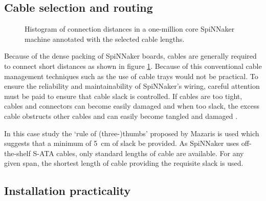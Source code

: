 		\subsection{Cable selection and routing}
			
			\begin{figure}
				
				\center
				
				\caption{Histogram of connection distances in a one-million core
				SpiNNaker machine annotated with the selected cable lengths.}
				\label{fig:wire-length-histogram}
				
			\end{figure}
			
			Because of the dense packing of SpiNNaker boards, cables are generally
			required to connect short distances as shown in figure
			\ref{fig:wire-length-histogram}. Because of this conventional cable
			management techniques such as the use of cable trays would not be
			practical. To ensure the reliability and maintainability of SpiNNaker's
			wiring, careful attention must be paid to ensure that cable slack is
			controlled.  If cables are too tight, cables and connectors can become
			easily damaged and when too slack, the excess cable obstructs other
			cables and can easily become tangled and damaged \cite{cisco07}.
			
			In this case study the `rule of (three-)thumbs' proposed by Mazaris
			\cite{mazaris97} is used which suggests that a minimum of
			\SI{5}{\centi\meter} of slack be provided. As SpiNNaker uses
			off-the-shelf S-ATA cables, only standard lengths of cable are available.
			For any given span, the shortest length of cable providing the requisite
			slack is used.
		
		\subsection{Installation practicality}
			
